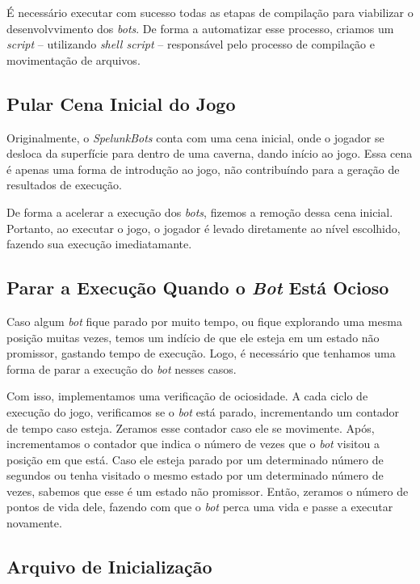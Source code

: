 É necessário executar com sucesso todas as etapas de compilação para viabilizar
o desenvolvvimento dos \textit{bots}. De forma a automatizar esse processo,
criamos um \textit{script} -- utilizando \textit{shell script} -- responsável
pelo processo de compilação e movimentação de arquivos.

\subsection{Pular Cena Inicial do Jogo}

Originalmente, o \textit{SpelunkBots} conta com uma cena inicial, onde o
jogador se desloca da superfície para dentro de uma caverna, dando início ao
jogo. Essa cena é apenas uma forma de introdução ao jogo, não contribuíndo para
a geração de resultados de execução.

De forma a acelerar a execução dos \textit{bots}, fizemos a remoção dessa cena
inicial. Portanto, ao executar o jogo, o jogador é levado diretamente ao nível
escolhido, fazendo sua execução imediatamante.

\subsection{Parar a Execução Quando o \textit{Bot} Está Ocioso}

Caso algum \textit{bot} fique parado por muito tempo, ou fique explorando uma
mesma posição muitas vezes, temos um indício de que ele esteja em um estado não
promissor, gastando tempo de execução. Logo, é necessário que tenhamos uma
forma de parar a execução do \textit{bot} nesses casos.

Com isso, implementamos uma verificação de ociosidade. A cada ciclo de execução
do jogo, verificamos se o \textit{bot} está parado, incrementando um contador
de tempo caso esteja. Zeramos esse contador caso ele se movimente. Após,
incrementamos o contador que indica o número de vezes que o \textit{bot}
visitou a posição em que está. Caso ele esteja parado por um determinado número
de segundos ou tenha visitado o mesmo estado por um determinado número de
vezes, sabemos que esse é um estado não promissor. Então, zeramos o número de
pontos de vida dele, fazendo com que o \textit{bot} perca uma vida e passe a
executar novamente.

\subsection{Arquivo de Inicialização}

